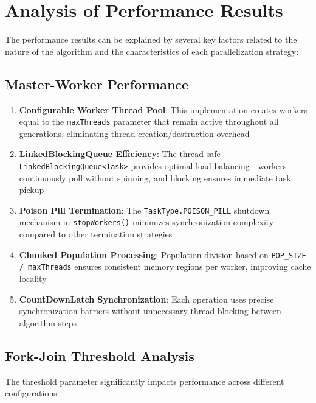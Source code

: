 \newpage

\section{Analysis of Performance Results}

The performance results can be explained by several key factors related to the
nature of the algorithm and the characteristics of each parallelization
strategy:

\subsection{Master-Worker Performance}

\begin{enumerate}
   \item \textbf{Configurable Worker Thread Pool}: This implementation creates
   workers equal to the \texttt{maxThreads} parameter that remain active
   throughout all generations, eliminating thread creation/destruction overhead
   \item \textbf{LinkedBlockingQueue Efficiency}: The thread-safe
   \texttt{LinkedBlockingQueue<Task>} provides optimal load balancing - workers
   continuously poll without spinning, and blocking ensures immediate task
   pickup
   \item \textbf{Poison Pill Termination}: The \texttt{TaskType.POISON\_PILL}
   shutdown mechanism in \texttt{stopWorkers()} minimizes synchronization
   complexity compared to other termination strategies
   \item \textbf{Chunked Population Processing}: Population division based on
   \texttt{POP\_SIZE / maxThreads} ensures consistent memory regions per worker,
   improving cache locality
   \item \textbf{CountDownLatch Synchronization}: Each operation uses precise
   synchronization barriers without unnecessary thread blocking between
   algorithm steps
\end{enumerate}

\newpage

\subsection{Fork-Join Threshold Analysis}

The threshold parameter significantly impacts performance across different
configurations:

